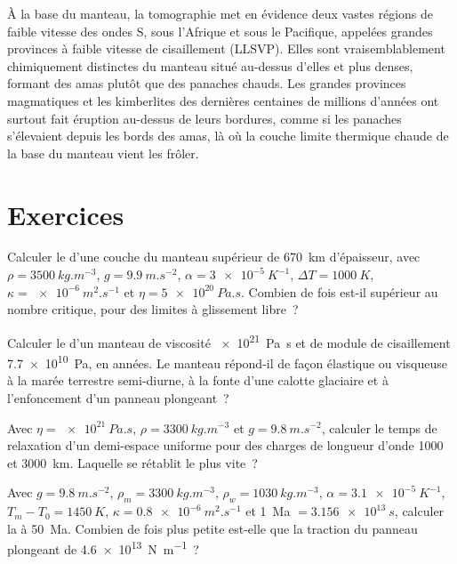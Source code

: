 À la base du manteau, la tomographie met en évidence deux vastes régions de faible vitesse des ondes S,
sous l'Afrique et sous le Pacifique, appelées grandes provinces à faible vitesse de cisaillement
(LLSVP). Elles sont vraisemblablement chimiquement distinctes du manteau situé au-dessus
d'elles et plus denses, formant des amas plutôt que des panaches chauds. Les grandes provinces magmatiques et
les kimberlites des dernières centaines de millions d'années ont surtout fait éruption au-dessus de leurs
bordures, comme si les panaches s'élevaient depuis les bords des amas, là où la couche limite
thermique chaude de la base du manteau vient les frôler.

\section{Exercices}

\begin{exercise}[$\star$]\label{exo:b3:mantle-convection:1}
Calculer le  d'une couche du manteau supérieur de \qty{670}{km} d'épaisseur, avec
$\rho = \qty{3500}{kg.m^{-3}}$, $g = \qty{9.9}{m.s^{-2}}$, $\alpha =
\qty{3e-5}{K^{-1}}$, $\Delta T = \qty{1000}{K}$, $\kappa =
\qty{e-6}{m^2.s^{-1}}$ et $\eta = \qty{5e20}{Pa.s}$. Combien de fois est-il supérieur au nombre
critique, pour des limites à glissement libre~?
\end{exercise}

\begin{exercise}[$\star$]\label{exo:b3:mantle-convection:2}
Calculer le  d'un manteau de viscosité \qty{e21}{Pa.s} et de
module de cisaillement \qty{7.7e10}{Pa}, en années. Le manteau répond-il de façon élastique ou visqueuse
à la marée terrestre semi-diurne, à la fonte d'une calotte glaciaire et à
l'enfoncement d'un panneau plongeant~?
\end{exercise}

\begin{exercise}[$\star$]\label{exo:b3:mantle-convection:3}
Avec $\eta = \qty{e21}{Pa.s}$, $\rho = \qty{3300}{kg.m^{-3}}$ et $g =
\qty{9.8}{m.s^{-2}}$, calculer le temps de relaxation d'un demi-espace uniforme pour
des charges de longueur d'onde 1000 et \qty{3000}{km}. Laquelle se rétablit le plus vite~?
\end{exercise}

\begin{exercise}[$\star$]\label{exo:b3:mantle-convection:4}
Avec $g = \qty{9.8}{m.s^{-2}}$, $\rho_m = \qty{3300}{kg.m^{-3}}$, $\rho_w =
\qty{1030}{kg.m^{-3}}$, $\alpha = \qty{3.1e-5}{K^{-1}}$, $T_m - T_0 =
\qty{1450}{K}$, $\kappa = \qty{0.8e-6}{m^2.s^{-1}}$ et \qty{1}{Ma} $=
\qty{3.156e13}{s}$, calculer la  à \qty{50}{Ma}. Combien de fois
plus petite est-elle que la traction du panneau plongeant de \qty{4.6e13}{N.m^{-1}}~?
\end{exercise}

